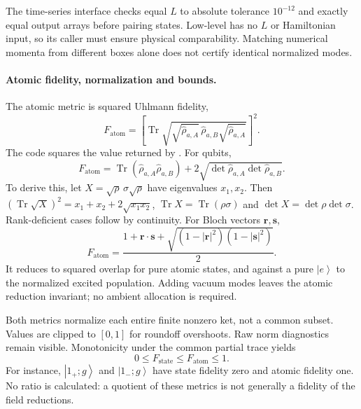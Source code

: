 \documentclass[11pt,a4paper]{article}
\newcommand{\ket}[1]{\left|#1\right\rangle}
\newcommand{\Tr}{\operatorname{Tr}}
\newcommand{\code}[1]{\texttt{\detokenize{#1}}}
\begin{document}
The time-series interface checks equal $L$ to absolute tolerance $10^{-12}$
and exactly equal output arrays before pairing states. Low-level
\code{compare_states} has no $L$ or Hamiltonian input, so its caller must
ensure physical comparability. Matching numerical momenta from different
boxes alone does not certify identical normalized modes.

\paragraph{Atomic fidelity, normalization and bounds.}
The atomic metric is squared Uhlmann fidelity,
\begin{equation}
 F_{\mathrm{atom}}=
 \left[\Tr\sqrt{\sqrt{\widehat\rho_{a,A}}\,
                    \widehat\rho_{a,B}\sqrt{\widehat\rho_{a,A}}}\right]^2.
 \label{eq:fatom}
\end{equation}
The code squares the value returned by \code{qutip.fidelity}. For qubits,
\begin{equation}
 F_{\mathrm{atom}}=\Tr(\widehat\rho_{a,A}\widehat\rho_{a,B})
                  +2\sqrt{\det\widehat\rho_{a,A}\det\widehat\rho_{a,B}}.
 \label{eq:qubit}
\end{equation}
To derive this, let $X=\sqrt\rho\,\sigma\sqrt\rho$ have eigenvalues $x_1,x_2$.
Then $(\Tr\sqrt X)^2=x_1+x_2+2\sqrt{x_1x_2}$,
$\Tr X=\Tr(\rho\sigma)$ and $\det X=\det\rho\det\sigma$.
Rank-deficient cases follow by continuity. For Bloch vectors $\bm r,\bm s$,
\begin{equation}
 F_{\mathrm{atom}}=\frac{1+\bm r\cdot\bm s
              +\sqrt{(1-|\bm r|^2)(1-|\bm s|^2)}}2.
\end{equation}
It reduces to squared overlap for pure atomic states, and against a pure
$\ket e$ to the normalized excited population. Adding vacuum modes leaves
the atomic reduction invariant; no ambient allocation is required.

Both metrics normalize each entire finite nonzero ket, not a common subset.
Values are clipped to $[0,1]$ for roundoff overshoots. Raw norm diagnostics
remain visible. Monotonicity under the common partial trace yields
\begin{equation}
 0\leq F_{\mathrm{state}}\leq F_{\mathrm{atom}}\leq1.
 \label{eq:monotonicity}
\end{equation}
For instance, $\ket{1_+;g}$ and $\ket{1_-;g}$ have state fidelity zero
and atomic fidelity one. No ratio is calculated: a quotient of these metrics
is not generally a fidelity of the field reductions.
\end{document}
